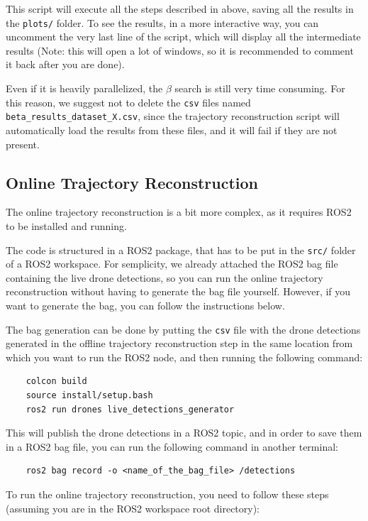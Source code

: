 \documentclass[11pt]{article}
\begin{document}
This script will execute all the steps described in above, saving all the results in the \texttt{plots/} folder. To see the results, in a more interactive way, you can uncomment the very last line of the script, which will display all the intermediate results (Note: this will open a lot of windows, so it is recommended to comment it back after you are done).

Even if it is heavily parallelized, the $\beta$ search is still very time consuming. For this reason, we suggest not to delete the \texttt{csv} files named \texttt{beta\_results\_dataset\_X.csv}, since the trajectory reconstruction script will automatically load the results from these files, and it will fail if they are not present.

\subsection{Online Trajectory Reconstruction}

The online trajectory reconstruction is a bit more complex, as it requires ROS2 to be installed and running.

The code is structured in a ROS2 package, that has to be put in the \texttt{src/} folder of a ROS2 workspace. For semplicity, we already attached the ROS2 bag file containing the live drone detections, so you can run the online trajectory reconstruction without having to generate the bag file yourself. However, if you want to generate the bag, you can follow the instructions below.

The bag generation can be done by putting the \texttt{csv} file with the drone detections generated in the offline trajectory reconstruction step in the same location from which you want to run the ROS2 node, and then running the following command:

\begin{verbatim}
    colcon build
    source install/setup.bash
    ros2 run drones live_detections_generator
\end{verbatim}

This will publish the drone detections in a ROS2 topic, and in order to save them in a ROS2 bag file, you can run the following command in another terminal:

\begin{verbatim}
    ros2 bag record -o <name_of_the_bag_file> /detections
\end{verbatim}

To run the online trajectory reconstruction, you need to follow these steps (assuming you are in the ROS2 workspace root directory):
\end{document}

